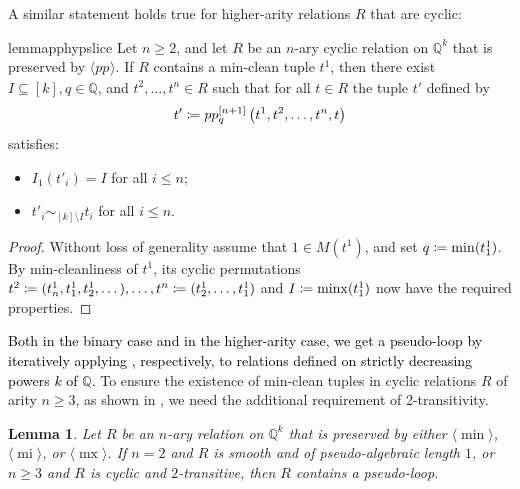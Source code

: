 \documentclass[a4paper,reqno, cleveref]{amsart}
\newcommand{\coloneqq}{\mathrel{\mathop:}\mathrel{\mkern-1.2mu}=}
\newtheorem{lemma}[theorem]{Lemma}
\newcommand{\Q}{\mathbb{Q}}
\newcommand{\br}[1]{[#1]}
\newcommand{\tup}{t}
\DeclareMathOperator{\mx}{mx}
\DeclareMathOperator{\mi}{mi}
\DeclareMathOperator{\minx}{minx}
\newcommand{\pp}[1]{pp_{#1}}
\newcommand{\nested}[2]{{#1^{[#2]}}}
\newcommand{\gen}[1]{\langle#1\rangle}
\newcommand\jo[1]{\textcolor{black}{#1}} %
\newcommand\mic[1]{\textcolor{black}{#1}} %
\begin{document}
A similar statement holds true for higher-arity relations $R$ that are cyclic: %

\begin{restatable}{lemma}{pphypslice}\label{l:hypslice} Let $n \geq 2$, and let $R$ be an $n$-ary cyclic relation on $\Q^k$ that is preserved by $\gen{\pp{}}$. If $R$ contains a min-clean tuple $\tup ^1$, then
%
there exist $I\subseteq \br k,  q\in \Q$, and $\tup^2, \dots, \tup^n\in R$ such that for all $\tup \in R$ the tuple $\tup'$  defined by 
  \begin{equation*}
       \tup'\coloneqq \nested{pp_q}{n+1} \left(\tup^1, \tup^2, \dots, \tup^n, \tup\right)
  \end{equation*} 
  satisfies:
  \begin{itemize}
      \item $I_{1}(\tup'_i)=I$ for all $i \leq n$;
      \item $\tup'_i\sim_{\br k\setminus I} \tup_i$ for all $i \leq  n$.
  \end{itemize}
\end{restatable}
\begin{proof}
Without loss of generality assume that $1 \in M(\tup^1)$, and set $q\coloneqq\min(\tup^1_1)$. By min-cleanliness of $\tup^1$, its cyclic permutations  $\tup^2\coloneqq(\tup^1_n, \tup^1_1, \tup^1_2, \dots), \dots, \tup^{n}\coloneqq(\tup^1_2, \dots, \tup^1_1)$ and $I\coloneqq\minx(\tup^1_1)$ now have the required properties. 
\end{proof}


\jo{ Both in the binary case and in the higher-arity case, we get a pseudo-loop  by iteratively applying \Cref{cl:pp:slice,l:hypslice}, respectively, to relations defined on strictly decreasing powers $k$ of $\Q$. } To ensure the existence of min-clean tuples in cyclic relations $R$ of arity $n \geq 3$, as shown in , we need the additional requirement of 2-transitivity.%


\begin{lemma}\label{lemma:pp:inductionstep} Let $R$ be an $n$-ary relation on $\Q^k$ that is preserved by either $\gen\min$, $\gen\mi$, or $\gen\mx$. If $n=2$ and $R$ is  smooth and of pseudo-algebraic length $1$, or $n\geq 3$ and $R$ is cyclic and $2$-transitive, then $R$ contains a pseudo-loop. 
\end{lemma}
\end{document}
